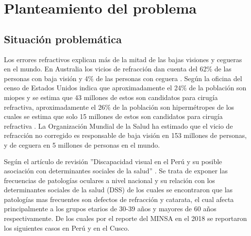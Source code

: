
\tableofcontents
\newpage


\section{Planteamiento del problema}


\subsection{Situación problemática}
\parindent=12.7mm Los errores refractivos explican más de la mitad de las bajas visiones y cegueras en el mundo. En Australia los vicios de refracción dan cuenta del 62$\%$ de las personas con baja visión y 4$\%$ de las personas con ceguera \citep{Taylor_2005}. Según la oficina del censo de Estados Unidos indica que aproximadamente el 24$\%$ de la población son miopes y se estima que 43 millones de estos son candidatos para cirugía refractiva, aproximadamente el 26$\%$ de la población son hipermétropes de los cuales se estima que solo 15 millones de estos son candidatos para cirugía refractiva \citep{lombardo2014demographics}. La Organización Mundial de la Salud ha estimado que el vicio de refracción no corregido es responsable de baja visión en 153 millones de personas, y de ceguera en 5 millones de personas en el mundo.

Según el artículo de revisión ''Discapacidad visual en el Perú y su posible asociación con determinantes sociales de la salud'' \citep{bernuy2022discvisual}. Se trata de exponer las frecuencias de patologías oculares a nivel nacional y su relación con los determinantes sociales de la salud (DSS) de los cuales se encontraron que las patologías mas frecuentes son defectos de refracción y catarata, el cual afecta principalmente a los grupos etarios de 30-39 años y mayores de 60 años respectivamente. De los cuales por el reporte del MINSA en el 2018 se reportaron los siguientes casos en Perú y en el Cusco.


